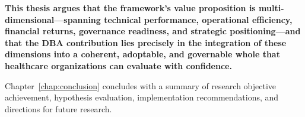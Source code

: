 \textbf{This thesis argues that the framework's value proposition is multi-dimensional---spanning technical performance, operational efficiency, financial returns, governance readiness, and strategic positioning---and that the DBA contribution lies precisely in the integration of these dimensions into a coherent, adoptable, and governable whole that healthcare organizations can evaluate with confidence.}

Chapter~\ref{chap:conclusion} concludes with a summary of research objective achievement, hypothesis evaluation, implementation recommendations, and directions for future research.
